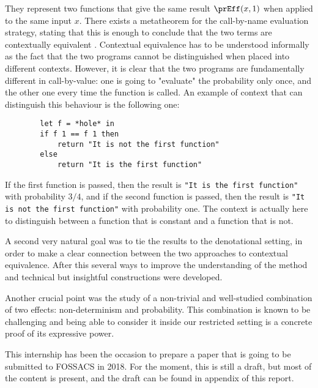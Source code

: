 They represent 
two functions that give the same result $\prEff (x, 1)$ when 
applied to the same input $x$. There exists a metatheorem 
for the call-by-name evaluation strategy, stating that this is 
enough to conclude that the two terms are contextually equivalent
\cite{gom}. Contextual equivalence has to be understood
informally as the fact that 
the two programs cannot be distinguished when placed into 
different contexts. However, it is clear that the two programs are fundamentally 
different in call-by-value: one is going to "evaluate" the probability 
only once, and the other one every time the function is called. An example 
of context that can distinguish this behaviour is the following one:

\begin{verbatim}
        let f = *hole* in
        if f 1 == f 1 then 
            return "It is not the first function"
        else
            return "It is the first function"
\end{verbatim}

If the first function is passed, then the result is \texttt{"It is the first
function"} with probability
$3/4$, and if the second function is passed, then the result is \texttt{"It is
not the first function"} with probability one. The context is actually
here to distinguish between a function that is constant and a function 
that is not.

A second very 
natural goal was to tie the results to the denotational 
setting, in order to make a clear connection between 
the two approaches to contextual equivalence.
After this several ways to improve 
the understanding of the method and technical but insightful 
constructions were developed. 

Another crucial point was the study of a non-trivial and 
well-studied combination of two effects: non-determinism and probability.
This combination is known to be challenging \cite{Mislove2000} and
being able to consider it inside our restricted setting is a concrete 
proof of its expressive power. 


This internship has been the occasion to prepare a paper that is going to be 
submitted to FOSSACS in 2018. For the moment, this is still a draft, but most 
of the content is present, and the draft can be found in appendix of this
report. 
